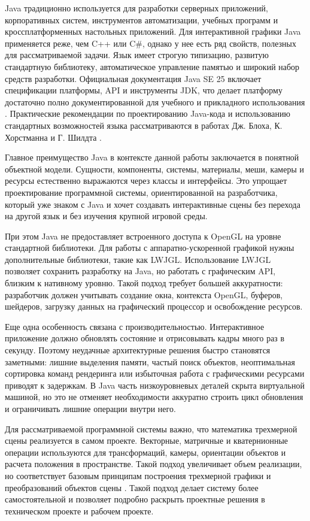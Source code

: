 Java традиционно используется для разработки серверных приложений,
корпоративных систем, инструментов автоматизации, учебных программ и
кроссплатформенных настольных приложений. Для интерактивной графики Java
применяется реже, чем C++ или C\#, однако у нее есть ряд свойств, полезных
для рассматриваемой задачи. Язык имеет строгую типизацию, развитую
стандартную библиотеку, автоматическое управление памятью и широкий набор
средств разработки. Официальная документация Java SE 25 включает
спецификации платформы, API и инструменты JDK, что делает платформу
достаточно полно документированной для учебного и прикладного
использования \cite{oracle-java25,java-language-spec,java-vm-spec}. Практические рекомендации по проектированию Java-кода и
использованию стандартных возможностей языка рассматриваются в работах
Дж. Блоха, К. Хорстманна и Г. Шилдта \cite{bloch-effective-java,horstmann-java-core,schildt-java}.

Главное преимущество Java в контексте данной работы заключается в
понятной объектной модели. Сущности, компоненты, системы, материалы,
меши, камеры и ресурсы естественно выражаются через классы и интерфейсы.
Это упрощает проектирование программной системы, ориентированной на
разработчика, который уже знаком с Java и хочет создавать интерактивные
сцены без перехода на другой язык и без изучения крупной игровой среды.

При этом Java не предоставляет встроенного доступа к OpenGL на уровне
стандартной библиотеки. Для работы с аппаратно-ускоренной графикой нужны
дополнительные библиотеки, такие как LWJGL. Использование LWJGL позволяет
сохранить разработку на Java, но работать с графическим API, близким к
нативному уровню. Такой подход требует большей аккуратности: разработчик
должен учитывать создание окна, контекста OpenGL, буферов, шейдеров,
загрузку данных на графический процессор и освобождение ресурсов.

Еще одна особенность связана с производительностью. Интерактивное
приложение должно обновлять состояние и отрисовывать кадры много раз в
секунду. Поэтому неудачные архитектурные решения быстро становятся
заметными: лишние выделения памяти, частый поиск объектов, неоптимальная
сортировка команд рендеринга или избыточная работа с графическими
ресурсами приводят к задержкам. В Java часть низкоуровневых деталей
скрыта виртуальной машиной, но это не отменяет необходимости аккуратно
строить цикл обновления и ограничивать лишние операции внутри него.

Для рассматриваемой программной системы важно, что математика
трехмерной сцены реализуется в самом проекте. Векторные, матричные и
кватернионные операции используются для трансформаций, камеры,
ориентации объектов и расчета положения в пространстве. Такой подход
увеличивает объем реализации, но соответствует базовым принципам построения
трехмерной графики и преобразований объектов сцены \cite{lengyel-math,shirley-fundamentals}.
Такой подход делает систему более самостоятельной и
позволяет подробно раскрыть проектные решения в техническом проекте и
рабочем проекте.

